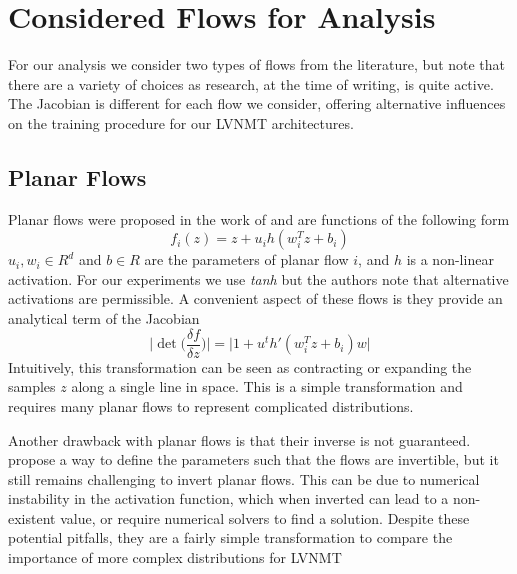 



\section{Considered Flows for Analysis}

For our analysis we consider two types of flows from the literature, but note that there are a variety of choices as research, at the time of writing, is quite active. The Jacobian is different for each flow we consider, offering alternative influences on the training procedure for our \ac{LVNMT} architectures. 

\subsection{Planar Flows}

Planar flows were proposed in the work of \citet{rezende2015VIwithNF} and are functions of the following form
\begin{equation}
f_{i}(z) = z + u_{i} h(w_{i}^{T} z + b_{i})
\end{equation}
$u_{i}, w_{i} \in R^{d}$ and $b \in R$ are the parameters of planar flow $i$, and $h$ is a non-linear activation. For our experiments we use \textit{tanh} but the authors note that alternative activations are permissible. A convenient aspect of these flows is they provide an analytical term of the Jacobian
\begin{equation}
\bigg| \det \bigg( \frac{\delta f}{\delta z} \bigg)\bigg|  = \bigg| 1 + u^{t} h'(w_{i}^{T} z + b_{i})w \bigg|
\end{equation} 
Intuitively, this transformation can be seen as contracting or expanding the samples $z$ along a single line in space. This is a simple transformation and requires many planar flows to represent complicated distributions.  %

Another drawback with planar flows is that their inverse is not guaranteed. \citet{rezende2015VIwithNF} propose a way to define the parameters such that the flows are invertible, but it still remains challenging to invert planar flows. This can be due to numerical instability in the activation function, which when inverted can lead to a non-existent value, or require numerical solvers to find a solution. Despite these potential pitfalls, they are a fairly simple transformation to compare the importance of more complex distributions for LVNMT

